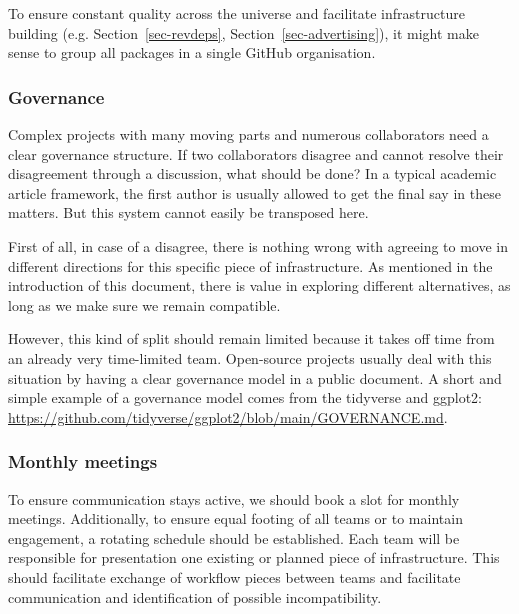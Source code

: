 \documentclass[
  letterpaper,
  DIV=11,
  numbers=noendperiod]{scrartcl}
\begin{document}
To ensure constant quality across the universe and facilitate
infrastructure building (e.g. Section~\ref{sec-revdeps},
Section~\ref{sec-advertising}), it might make sense to group all
packages in a single GitHub organisation.

\hypertarget{governance}{%
\subsubsection{Governance}\label{governance}}

Complex projects with many moving parts and numerous collaborators need
a clear governance structure. If two collaborators disagree and cannot
resolve their disagreement through a discussion, what should be done? In
a typical academic article framework, the first author is usually
allowed to get the final say in these matters. But this system cannot
easily be transposed here.

First of all, in case of a disagree, there is nothing wrong with
agreeing to move in different directions for this specific piece of
infrastructure. As mentioned in the introduction of this document, there
is value in exploring different alternatives, as long as we make sure we
remain compatible.

However, this kind of split should remain limited because it takes off
time from an already very time-limited team. Open-source projects
usually deal with this situation by having a clear governance model in a
public document. A short and simple example of a governance model comes
from the tidyverse and ggplot2:
\url{https://github.com/tidyverse/ggplot2/blob/main/GOVERNANCE.md}.

\hypertarget{monthly-meetings}{%
\subsubsection{Monthly meetings}\label{monthly-meetings}}

To ensure communication stays active, we should book a slot for monthly
meetings. Additionally, to ensure equal footing of all teams or to
maintain engagement, a rotating schedule should be established. Each
team will be responsible for presentation one existing or planned piece
of infrastructure. This should facilitate exchange of workflow pieces
between teams and facilitate communication and identification of
possible incompatibility.
\end{document}
